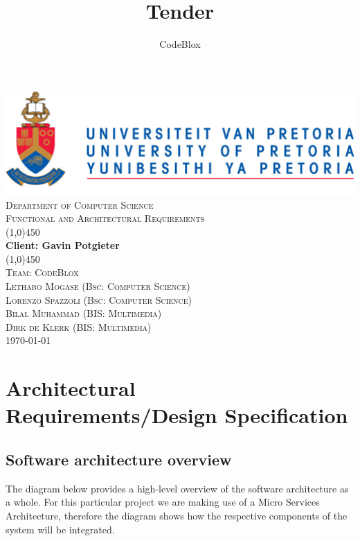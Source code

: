 \documentclass[a4paper,12pt]{article}
\author{CodeBlox}
\title{Tender}
\begin{document}
	\setlength{\parskip}{6pt}
	
	\begin{titlepage}
		\begin{center}
			\includegraphics[width=1\textwidth]{./Pictures/up_logo.png}\\[1.5cm] 
			\textsc{\LARGE Department of Computer Science} \\ [.5cm]
			\textsc{\Large Functional and Architectural Requirements} \\ [.5cm]
			\line(1,0){450}\\[.5cm]
			\huge{\bfseries Client: Gavin Potgieter}\\
			\line(1,0){450}\\[.5cm]
			\textsc{\LARGE Team: CodeBlox}\\ [0.5cm]
			
			
			\textsc{\large Lethabo Mogase (Bsc: Computer Science)}\\
			\textsc{\large Lorenzo Spazzoli (Bsc: Computer Science)}\\
			\textsc{\large Bilal Muhammad (BIS: Multimedia)}\\
			\textsc{\large Dirk de Klerk (BIS: Multimedia)}\\ [3.9cm]
			
			\large\today
		\end{center}
	\end{titlepage}
	
	\tableofcontents
	\thispagestyle{empty}
	\footnotesize
	\normalsize
	
	\newpage
	\section{Architectural Requirements/Design Specification}
	
	\subsection{Software architecture overview}
	
	The diagram below provides a high-level overview of the software architecture as a whole. For this particular project we are making use of a Micro Services Architecture, therefore the diagram shows how the respective components of the system will be integrated.\\
	
\end{document}
